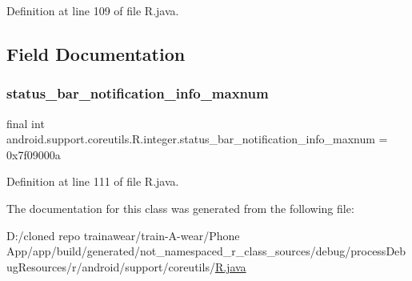 Definition at line 109 of file R.\+java.


\begin{DoxyCode}{0}

\end{DoxyCode}


\subsection{Field Documentation}
\mbox{\label{classandroid_1_1support_1_1coreutils_1_1_r_1_1integer_a606a74180704d03d0e19248a38ad09dd}} 
\subsubsection{\texorpdfstring{status\_bar\_notification\_info\_maxnum}{status\_bar\_notification\_info\_maxnum}}
{\footnotesize\ttfamily final int android.\+support.\+coreutils.\+R.\+integer.\+status\+\_\+bar\+\_\+notification\+\_\+info\+\_\+maxnum = 0x7f09000a\hspace{0.3cm}{\ttfamily [static]}}



Definition at line 111 of file R.\+java.



The documentation for this class was generated from the following file\+:\begin{DoxyCompactItemize}
\item 
D\+:/cloned repo trainawear/train-\/\+A-\/wear/\+Phone App/app/build/generated/not\+\_\+namespaced\+\_\+r\+\_\+class\+\_\+sources/debug/process\+Debug\+Resources/r/android/support/coreutils/\mbox{\hyperlink{process_debug_resources_2r_2android_2support_2coreutils_2_r_8java}{R.\+java}}\end{DoxyCompactItemize}
